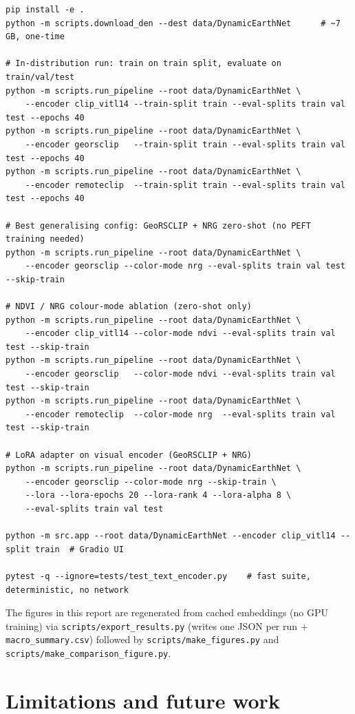 \documentclass{article}
\begin{document}
\begin{verbatim}
pip install -e .
python -m scripts.download_den --dest data/DynamicEarthNet      # ~7 GB, one-time

# In-distribution run: train on train split, evaluate on train/val/test
python -m scripts.run_pipeline --root data/DynamicEarthNet \
    --encoder clip_vitl14 --train-split train --eval-splits train val test --epochs 40
python -m scripts.run_pipeline --root data/DynamicEarthNet \
    --encoder georsclip   --train-split train --eval-splits train val test --epochs 40
python -m scripts.run_pipeline --root data/DynamicEarthNet \
    --encoder remoteclip  --train-split train --eval-splits train val test --epochs 40

# Best generalising config: GeoRSCLIP + NRG zero-shot (no PEFT training needed)
python -m scripts.run_pipeline --root data/DynamicEarthNet \
    --encoder georsclip --color-mode nrg --eval-splits train val test --skip-train

# NDVI / NRG colour-mode ablation (zero-shot only)
python -m scripts.run_pipeline --root data/DynamicEarthNet \
    --encoder clip_vitl14 --color-mode ndvi --eval-splits train val test --skip-train
python -m scripts.run_pipeline --root data/DynamicEarthNet \
    --encoder georsclip   --color-mode ndvi --eval-splits train val test --skip-train
python -m scripts.run_pipeline --root data/DynamicEarthNet \
    --encoder remoteclip  --color-mode nrg  --eval-splits train val test --skip-train

# LoRA adapter on visual encoder (GeoRSCLIP + NRG)
python -m scripts.run_pipeline --root data/DynamicEarthNet \
    --encoder georsclip --color-mode nrg --skip-train \
    --lora --lora-epochs 20 --lora-rank 4 --lora-alpha 8 \
    --eval-splits train val test

python -m src.app --root data/DynamicEarthNet --encoder clip_vitl14 --split train  # Gradio UI

pytest -q --ignore=tests/test_text_encoder.py    # fast suite, deterministic, no network
\end{verbatim}

The figures in this report are regenerated from cached embeddings (no GPU
training) via \texttt{scripts/export\_results.py} (writes one JSON per run +
\texttt{macro\_summary.csv}) followed by \texttt{scripts/make\_figures.py} and
\texttt{scripts/make\_comparison\_figure.py}.


\section{Limitations and future work}
\label{sec:future}
\end{document}
